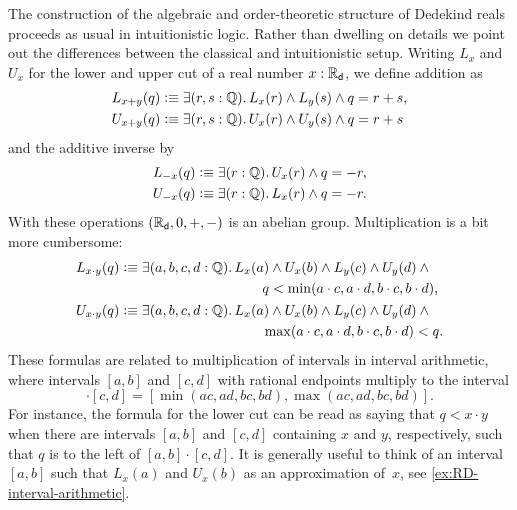 The construction of the algebraic and order-theoretic structure of Dedekind reals proceeds
as usual in intuitionistic logic. Rather than dwelling on details we point out the
differences between the classical and intuitionistic setup. Writing $L_x$ and $U_x$ for
the lower and upper cut of a real number $x : \mathbb{R}_\mathsf{d}$, we define addition as%
%
\begin{align*}
  L_{x + y}(q) &\defeq \exis{r, s : \Q} L_x(r) \land L_y(s) \land q = r + s, \\
  U_{x + y}(q) &\defeq \exis{r, s : \Q} U_x(r) \land U_y(s) \land q = r + s
\end{align*}
%
and the additive inverse by
%
\begin{align*}
  L_{-x}(q) &\defeq \exis{r : \Q} U_x(r) \land q = - r, \\
  U_{-x}(q) &\defeq \exis{r : \Q} L_x(r) \land q = - r.
\end{align*}
%
With these operations $(\mathbb{R}_\mathsf{d}, 0, {+}, {-})$ is an abelian group. Multiplication is a bit
more cumbersome:
%
\begin{align*}
  L_{x \cdot y}(q) &\defeq
  \begin{aligned}[t]
    \exis{a, b, c, d : \Q} & L_x(a) \land U_x(b) \land L_y(c) \land U_y(d) \land {}\\
                           & \qquad q < \min (a \cdot c, a \cdot d, b \cdot c, b \cdot d),
  \end{aligned} \\
  U_{x \cdot y}(q) &\defeq
  \begin{aligned}[t]
    \exis{a, b, c, d : \Q} & L_x(a) \land U_x(b) \land L_y(c) \land U_y(d) \land {}\\
                           & \qquad \max (a \cdot c, a \cdot d, b \cdot c, b \cdot d) < q.
  \end{aligned}
\end{align*}
%
These formulas are related to multiplication of intervals in interval arithmetic, where
intervals $[a,b]$ and $[c,d]$ with rational endpoints multiply to the interval
%
\begin{equation*}
  [a,b] \cdot [c,d] =
  [\min(a c, a d, b c, b d), \max(a c, a d, b c, b d)].
\end{equation*}
%
For instance, the formula for the lower cut can be read as saying that $q < x \cdot y$
when there are intervals $[a,b]$ and $[c,d]$ containing $x$ and $y$, respectively, such
that $q$ is to the left of $[a,b] \cdot [c,d]$. It is generally useful to think of an
interval $[a,b]$ such that $L_x(a)$ and $U_x(b)$ as an approximation of~$x$, see
\autoref{ex:RD-interval-arithmetic}.

